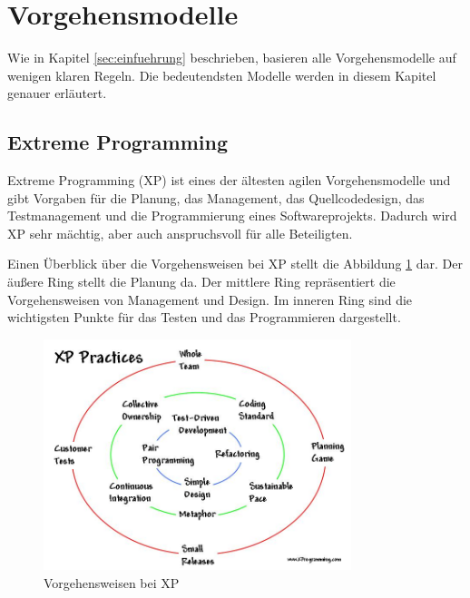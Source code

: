 \section{Vorgehensmodelle}
Wie in Kapitel \ref{sec:einfuehrung} beschrieben, basieren alle Vorgehensmodelle auf wenigen klaren Regeln. Die bedeutendsten Modelle werden in diesem Kapitel genauer erläutert.

\subsection{Extreme Programming}
Extreme Programming (XP) ist eines der ältesten agilen Vorgehensmodelle und gibt Vorgaben für die Planung, das Management, das Quellcodedesign, das Testmanagement und die Programmierung eines Softwareprojekts. Dadurch wird XP sehr mächtig, aber auch anspruchsvoll für alle Beteiligten. \cite[S. 13]{bib:wolfRoock} \cite{bib:xp}

Einen Überblick über die Vorgehensweisen bei XP stellt die Abbildung \ref{fig:xppractices} dar. Der äußere Ring stellt die Planung da. Der mittlere Ring repräsentiert die Vorgehensweisen von Management und Design. Im inneren Ring sind die wichtigsten Punkte für das Testen und das Programmieren dargestellt.

\begin{figure}[h]
  \centering
  \includegraphics[width=0.8\textwidth]{images/xpCircles}
  \caption{Vorgehensweisen bei XP \cite{bib:xprogamming}}
  \label{fig:xppractices}
\end{figure}

